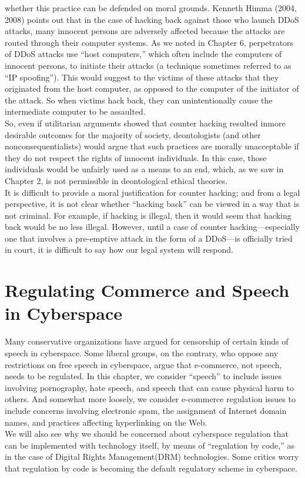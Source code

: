 \documentclass[12pt]{article}
\theoremstyle{definition}
\begin{document}
whether this practice can be defended on moral grounds. Kenneth Himma (2004, 2008)
points out that in the case of hacking back against those who launch DDoS attacks, many
innocent persons are adversely affected because the attacks are routed through their
computer systems. As we noted in Chapter 6, perpetrators of DDoS attacks use “host
computers,” which often include the computers of innocent persons, to initiate their
attacks (a technique sometimes referred to as “IP spoofing”). This would suggest to the
victims of these attacks that they originated from the host computer, as opposed to the
computer of the initiator of the attack. So when victims hack back, they can unintentionally
cause the intermediate computer to be assaulted.\\
So, even if utilitarian arguments showed that counter hacking resulted inmore desirable
outcomes for the majority of society, deontologists (and other nonconsequentialists) would
argue that such practices are morally unacceptable if they do not respect the rights of
innocent individuals. In this case, those individuals would be unfairly used as a means to an
end, which, as we saw in Chapter 2, is not permissible in deontological ethical theories.\\
It is difficult to provide a moral justification for counter hacking; and from a legal
perspective, it is not clear whether “hacking back” can be viewed in a way that is not
criminal. For example, if hacking is illegal, then it would seem that hacking back would be
no less illegal. However, until a case of counter hacking—especially one that involves a
pre-emptive attack in the form of a DDoS—is officially tried in court, it is difficult to say
how our legal system will respond.
\clearpage
\section{Regulating Commerce and Speech in Cyberspace}
Many conservative organizations have argued for censorship of certain kinds of
speech in cyberspace. Some liberal groups, on the contrary, who oppose any restrictions
on free speech in cyberspace, argue that e-commerce, not speech, needs to be regulated.
In this chapter, we consider “speech” to include issues involving pornography, hate
speech, and speech that can cause physical harm to others. And somewhat more loosely,
we consider e-commerce regulation issues to include concerns involving electronic
spam, the assignment of Internet domain names, and practices affecting hyperlinking
on the Web.\\
We will also see why we should be concerned about cyberspace regulation that can
be implemented with technology itself, by means of “regulation by code,” as in the case
of Digital Rights Management(DRM) technologies. Some critics worry that regulation by code is becoming the default regulatory scheme in cyberspace.\\
\end{document}
